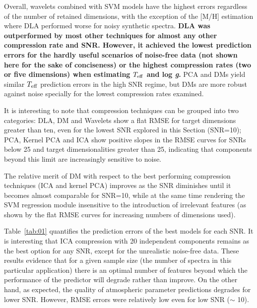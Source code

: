 \documentclass[a4paper,fleqn,usenatbib]{mnras}
\begin{document}
{{{Overall, wavelets combined with SVM models have the highest errors
regardless of the number of retained dimensions, with the exception of
the [M/H] estimation where DLA performed worse for noisy synthetic
spectra. {\bf DLA was outperformed by most other techniques for almost 
any other compression rate and SNR. However, it achieved the lowest 
prediction errors for the hardly useful scenarios of noise-free data 
(not shown here for the sake of conciseness) or the highest compression 
rates (two or five dimensions) when estimating $T_{\rm eff}$ and 
log \textit{g}.} PCA and DMs yield similar $T_{\rm eff}$ prediction
errors in the high SNR regime, but DMs are more robust against noise
specially for the lowest compression rates examined.

It is interesting to note that compression techniques can be grouped
into two categories: DLA, DM and Wavelets show a flat RMSE for target
dimensions greater than ten, even for the lowest SNR explored in this
Section (SNR=10); PCA, Kernel PCA and ICA show positive slopes in the
RMSE curves for SNRs below 25 and target dimensionalities greater than
25, indicating that components beyond this limit are increasingly
sensitive to noise. 

The relative merit of DM with respect to the best
performing compression techniques (ICA and kernel PCA) improves as the
SNR diminishes until it becomes almost comparable for SNR=10, while at
the same time rendering the SVM regression module insensitive to the
introduction of irrelevant features (as shown by the flat RMSE curves
for increasing numbers of dimensions used). 

Table~\ref{tab:01} quantifies the prediction errors of the best models
for each SNR. It is interesting that ICA compression with 20
independent components remains as the best option for any SNR, except
for the unrealistic noise-free data. 
These results evidence that for a given sample
size (the number of spectra in this particular application) there is
an optimal number of features beyond which the performance of the
predictor will degrade rather than improve.  On the other hand, as
expected, the quality of atmospheric parameter predictions degrades 
for lower SNR. However, RMSE errors were relatively low even for 
low SNR ($\sim$ 10).  

}}}
\end{document}
